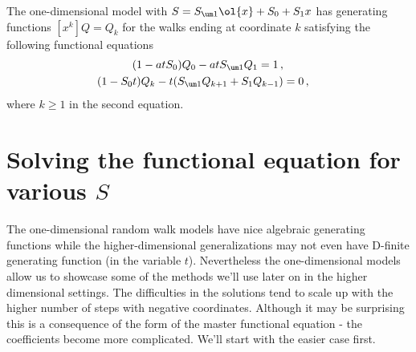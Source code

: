 \begin{prop} The one-dimensional model with  $S = S_{\um 1}\ol{x}+S_0 + S_1 x$ has generating functions $[x^k]Q = Q_k$ for the walks ending at coordinate $k$ satisfying the following functional equations
\begin{align}
	(1-atS_0)Q_0-atS_{\um 1}Q_1 = 1\,,\\
	 (1-S_0t) Q_k -t(S_{\um 1}Q_{k+1} + S_1 Q_{k-1}) &= 0\,,
\end{align}
where $k\ge 1$ in the second equation.
\end{prop}

\section{Solving the functional equation for various $S$}
\label{sec:Solving1D}
The one-dimensional random walk models have nice algebraic generating functions while the higher-dimensional generalizations may not even have D-finite generating function (in the variable $t$). Nevertheless the one-dimensional models allow us to showcase some of the methods we'll use later on in the higher dimensional settings. The difficulties in the solutions tend to scale up with the higher number of steps with negative coordinates. Although it may be surprising this is a consequence of the form of the master functional equation - the coefficients become more complicated. We'll start with the easier case first.
